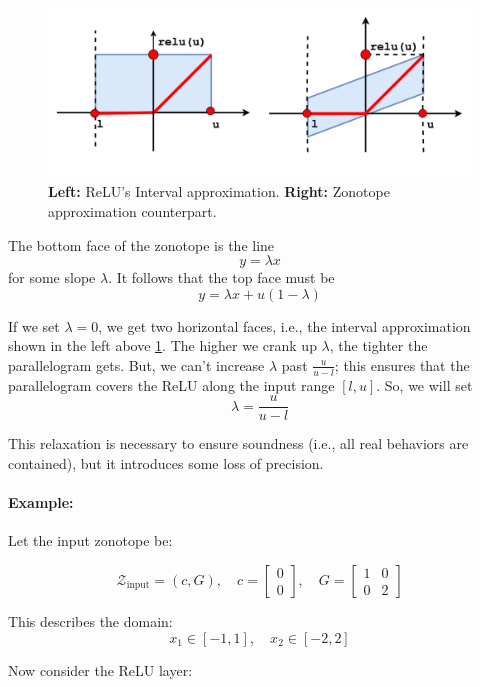 \documentclass[oneside,11pt,dvipsnames]{book}
\numberwithin{equation}{section}
\theoremstyle{definition}
\theoremstyle{remark}
\begin{document}
\begin{figure}
    \centering
    \includegraphics[width=1\linewidth]{figure/zonotope_vs_interval.png}
    \caption{\textbf{Left:} ReLU's Interval approximation. \textbf{Right:} Zonotope approximation counterpart.}
    \label{fig:zonotope_vs_interval}
\end{figure}


The bottom face of the zonotope is the line
\[
y = \lambda x
\]
for some slope \(\lambda\). It follows that the top face must be
\[
y = \lambda x + u(1 - \lambda)
\]

If we set \(\lambda = 0\), we get two horizontal faces, i.e., the interval approximation shown in the left above \ref{fig:zonotope_vs_interval}. The higher we crank up \(\lambda\), the tighter the parallelogram gets. But, we can’t increase \(\lambda\) past \( \frac{u}{u - l} \); this ensures that the parallelogram covers the ReLU along the input range \([l, u]\). So, we will set
\[
\lambda = \frac{u}{u - l}
\]

This relaxation is necessary to ensure soundness (i.e., all real behaviors are contained), but it introduces some loss of precision.

\paragraph{Example:} Let the input zonotope be:

\[
\mathcal{Z}_{\text{input}} = (c, G), \quad
c = \begin{bmatrix} 0 \\ 0 \end{bmatrix}, \quad
G = \begin{bmatrix} 1 & 0 \\ 0 & 2 \end{bmatrix}
\]

This describes the domain:
\[
x_1 \in [-1, 1], \quad x_2 \in [-2, 2]
\]

Now consider the ReLU layer:
\end{document}

